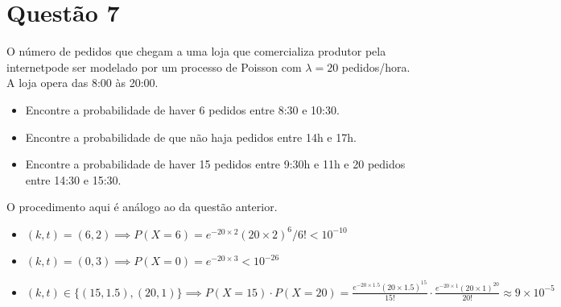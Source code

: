 \section{Questão 7}

O número de pedidos que chegam a uma loja que comercializa produtor pela internetpode ser modelado por um processo de Poisson com $\lambda = 20$ pedidos/hora. 
A loja opera das 8:00 às 20:00.

\begin{itemize}
    \item [a)] Encontre a probabilidade de haver 6 pedidos entre 8:30 e 10:30.
    \item [b)] Encontre a probabilidade de que não haja pedidos entre 14h e 17h.
    \item [c)] Encontre a probabilidade de haver 15 pedidos entre 9:30h e 11h e 20 pedidos entre 14:30 e 15:30.
\end{itemize}

\begin{respostas}

O procedimento aqui é análogo ao da questão anterior.

\begin{itemize}
    \item [a)] $(k,t) = (6, 2) \implies P(X = 6) = e^{-20 \times 2} (20 \times 2)^6/6! < 10^{-10}$
    \item [b)] $(k,t) = (0, 3) \implies P(X = 0) = e^{-20 \times 3} < 10^{-26}$
    \item [c)] 
    $(k,t) \in \{(15, 1.5), (20, 1)\} \implies P(X = 15) \cdot P(X = 20) 
    = \frac{e^{-20 \times 1.5} (20 \times 1.5)^{15}}{15!} \cdot 
      \frac{e^{-20 \times 1} (20 \times 1)^{20}}{20!}
    \approx 9\times 10^{-5}$
\end{itemize}
\end{respostas}